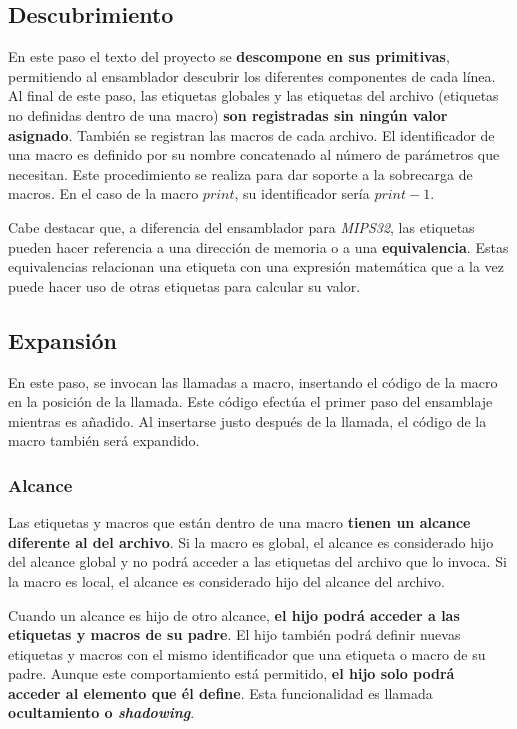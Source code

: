 \subsection{Descubrimiento}\label{subsec:descubrimiento}

En este paso el texto del proyecto se \textbf{descompone en sus primitivas},
permitiendo al ensamblador descubrir los diferentes componentes de cada línea.
Al final de este paso, las etiquetas globales y las etiquetas del archivo
(etiquetas no definidas dentro de una macro) \textbf{son registradas sin
ningún valor asignado}.
También se registran las macros de cada archivo.
El identificador de una macro es definido por su nombre concatenado
al número de parámetros que necesitan.
Este procedimiento se realiza para dar soporte a la sobrecarga de macros.
En el caso de la macro $print$, su identificador sería
$print-1$.

Cabe destacar que, a diferencia del ensamblador para \textit{MIPS32},
las etiquetas pueden hacer referencia a una dirección de memoria
o a una \textbf{equivalencia}.
Estas equivalencias relacionan una etiqueta con una expresión matemática
que a la vez puede hacer uso de otras etiquetas para calcular su valor.

\subsection{Expansión}\label{subsec:expansion}

En este paso, se invocan las llamadas a macro,
insertando el código de la macro en la posición de la llamada.
Este código efectúa el primer paso del ensamblaje mientras es añadido.
Al insertarse justo después de la llamada, el código de la macro
también será expandido.

\subsubsection{Alcance}\label{subsubsec:alcance}

Las etiquetas y macros que están dentro de una macro
\textbf{tienen un alcance diferente al del archivo}.
Si la macro es global, el alcance es considerado hijo del alcance global
y no podrá acceder a las etiquetas del archivo que lo invoca.
Si la macro es local, el alcance es considerado hijo del alcance del archivo.

Cuando un alcance es hijo de otro alcance,
\textbf{el hijo podrá acceder a las etiquetas y macros de su padre}.
El hijo también podrá definir nuevas etiquetas y macros con el mismo
identificador que una etiqueta o macro de su padre.
Aunque este comportamiento está permitido, \textbf{el hijo solo podrá acceder
al elemento que él define}.
Esta funcionalidad es llamada \textbf{ocultamiento o \textit{shadowing}}.

